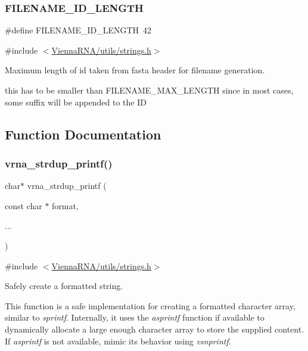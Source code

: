 \subsubsection{\texorpdfstring{FILENAME\_ID\_LENGTH}{FILENAME\_ID\_LENGTH}}
{\footnotesize\ttfamily \#define F\+I\+L\+E\+N\+A\+M\+E\+\_\+\+I\+D\+\_\+\+L\+E\+N\+G\+TH~42}



{\ttfamily \#include $<$\mbox{\hyperlink{strings_8h}{Vienna\+R\+N\+A/utils/strings.\+h}}$>$}



Maximum length of id taken from fasta header for filename generation. 

this has to be smaller than F\+I\+L\+E\+N\+A\+M\+E\+\_\+\+M\+A\+X\+\_\+\+L\+E\+N\+G\+TH since in most cases, some suffix will be appended to the ID 

\subsection{Function Documentation}
\mbox{\label{group__string__utils_ga33cc0190a326ec368277caa777b8bf18}} 
\subsubsection{\texorpdfstring{vrna\_strdup\_printf()}{vrna\_strdup\_printf()}}
{\footnotesize\ttfamily char$\ast$ vrna\+\_\+strdup\+\_\+printf (\begin{DoxyParamCaption}\item[{const char $\ast$}]{format,  }\item[{}]{... }\end{DoxyParamCaption})}



{\ttfamily \#include $<$\mbox{\hyperlink{strings_8h}{Vienna\+R\+N\+A/utils/strings.\+h}}$>$}



Safely create a formatted string. 

This function is a safe implementation for creating a formatted character array, similar to {\itshape sprintf}. Internally, it uses the {\itshape asprintf} function if available to dynamically allocate a large enough character array to store the supplied content. If {\itshape asprintf} is not available, mimic it\textquotesingle{}s behavior using {\itshape vsnprintf}.

